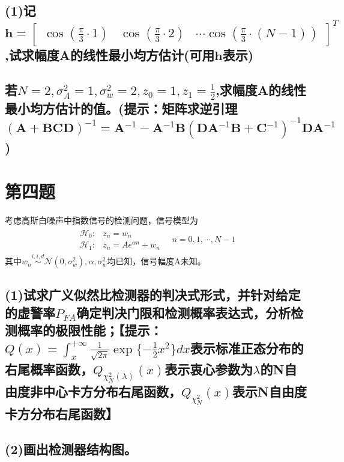 \documentclass[fontset=windows]{article}
\numberwithin{figure}{section}
\begin{document}
\subsection*{(1)记\(\mathbf{h}=\begin{bmatrix}
		\cos(\frac{\pi}{3}\cdot 1) & \cos(\frac{\pi}{3}\cdot 2) & \cdots \cos(\frac{\pi}{3}\cdot (N-1))
	\end{bmatrix}^T\),试求幅度A的线性最小均方估计(可用\(\mathbf{h}\)表示)}

\subsection*{若\(N=2,\sigma^2_A=1,\sigma^2_w=2,z_0=1,z_1=\frac{1}{2}\),求幅度A的线性最小均方估计的值。(提示：矩阵求逆引理\((\mathbf{A}+\mathbf{BCD})^{-1}=\mathbf{A}^{-1}-\mathbf{A}^{-1}\mathbf{B}(\mathbf{DA}^{-1}\mathbf{B}+\mathbf{C}^{-1})^{-1}\mathbf{DA}^{-1}\))}

\section{第四题}
考虑高斯白噪声中指数信号的检测问题，信号模型为
\begin{align*}
	\begin{matrix}
		\mathcal{H}_0: & z_n=w_n               \\
		\mathcal{H}_1: & z_n=Ae^{\alpha n}+w_n
	\end{matrix}\quad n=0,1,\cdots, N-1
\end{align*}
其中\(w_n\overset{i,i,d}{\sim}\mathcal{N}(0,\sigma^2_w),\alpha,\sigma^2_w\)均已知，信号幅度A未知。

\subsection*{(1)试求广义似然比检测器的判决式形式，并针对给定的虚警率\(P_{FA}\)确定判决门限和检测概率表达式，分析检测概率的极限性能；【提示：\(Q(x)=\int_{x}^{+\infty}\frac{1}{\sqrt{2\pi}}\exp\{-\frac{1}{2}x^2\}dx\)表示标准正态分布的右尾概率函数，\(Q_{\chi^2_N(\lambda)}(x)\)表示衷心参数为\(\lambda\)的N自由度非中心卡方分布右尾函数，\(Q_{\chi^2_N}(x)\)表示N自由度卡方分布右尾函数】}

\subsection*{(2)画出检测器结构图。}
\end{document}
